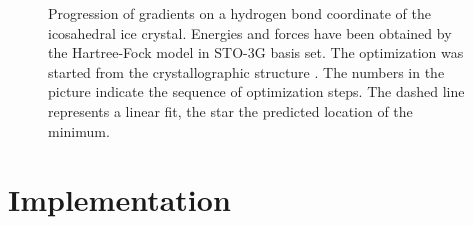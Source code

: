 \documentclass[prl,aps,preprint,superbib,12pt]{revtex4}
\begin{document}
\begin{figure}[h]
\caption{
Progression of gradients on a hydrogen bond coordinate
of the icosahedral ice crystal.
Energies and forces have been obtained by the Hartree-Fock
model in STO-3G basis set.
The optimization was started from the crystallographic structure
\cite{AGoto90}.
The numbers in the picture
indicate the sequence of optimization steps. The dashed line represents
a linear fit, the star the predicted location of the minimum.}
\label{iceIh}
\end{figure}


\section{Implementation}
\end{document}
